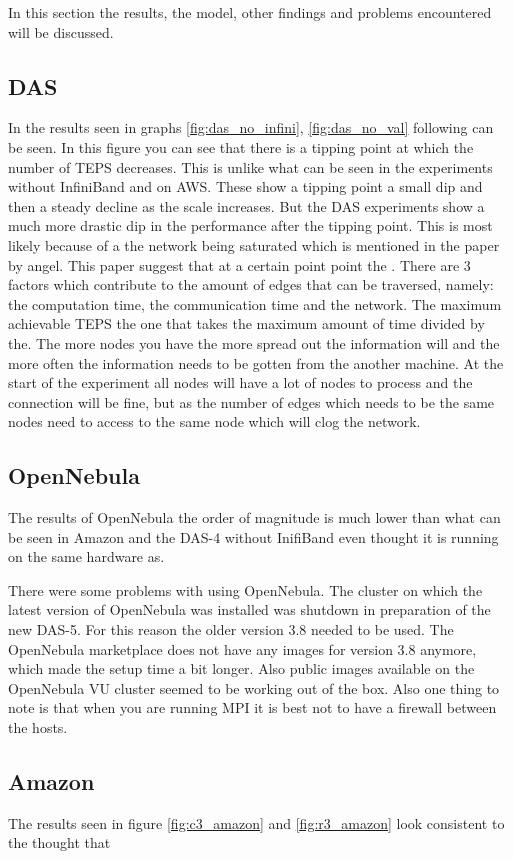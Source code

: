 In this section the results, the model, other findings and problems encountered will be discussed.

\subsection{DAS}
In the results seen in graphs \ref{fig:das_no_infini}, \ref{fig:das_no_val} following can be seen. In this figure you can see that there is a tipping point at which the number of TEPS decreases. This is unlike what can be seen in the experiments without InfiniBand and on AWS. These show a tipping point a small dip and then a steady decline as the scale increases. But the DAS experiments show a much more drastic dip in the performance after the tipping point. This is most likely because of a the network being saturated which is mentioned in the paper by angel. This paper suggest that at a certain point point the . There are 3 factors which contribute to the amount of edges that can be traversed, namely: the computation time, the communication time and the network. The maximum achievable TEPS the one that takes the maximum amount of time divided by the. The more nodes you have the more spread out the information will and the more often the information needs to be gotten from the another machine. At the start of the experiment all nodes will have a lot of nodes to process and the connection will be fine, but as the number of edges which needs to be the same nodes need to access to the same node which will clog the network.


\subsection{OpenNebula}
The results of OpenNebula the order of magnitude is much lower than what can be seen in Amazon and the DAS-4 without InifiBand even thought it is running on the same hardware as.

There were some problems with using OpenNebula. The cluster on which the latest version of OpenNebula was installed was shutdown in preparation of the new DAS-5. For this reason the older version 3.8 needed to be used. The OpenNebula marketplace does not have any images for version 3.8 anymore, which made the setup time a bit longer. Also public images available on the OpenNebula VU cluster seemed to be working out of the box. Also one thing to note is that when you are running MPI it is best not to have a firewall between the hosts. 

\subsection{Amazon}
The results seen in figure \ref{fig:c3_amazon} and \ref{fig:r3_amazon} look consistent to the thought that

